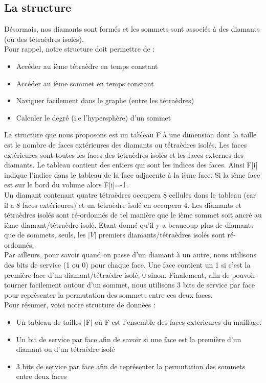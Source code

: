 \documentclass[a4paper,11pt,openany]{article}
\begin{document}
\subsection{La structure}
\noindent
Désormais, nos diamants sont formés et les sommets sont associés à des diamants (ou des tétraèdres isolés).\\
Pour rappel, notre structure doit permettre de :
\begin{itemize}
\item Accéder au ième tétraèdre en temps constant
\item Accéder au ième sommet en temps constant
\item Naviguer facilement dans le graphe (entre les tétraèdres)
\item Calculer le degré (i.e l'hypersphère) d'un sommet\\
\end{itemize}
La structure que nous proposons est un tableau F à une dimension dont la taille est le nombre de faces extérieures des diamants ou tétraèdres isolés. Les faces extérieures sont toutes les faces des tétraèdres isolés et les faces externes des diamants. Le tableau contient des entiers qui sont les indices des faces. Ainsi F[i] indique l'indice dans le tableau de la face adjacente à la ième face. Si la ième face est sur le bord du volume alors F[i]=-1.\\ 
Un diamant contenant quatre tétraèdres occupera 8 cellules dans le tableau (car il a 8 faces extérieures) et un tétraèdre isolé en occupera 4. Les diamants et tétraèdres isolés sont ré-ordonnés de tel manière que le ième sommet soit ancré au ième diamant/tétraèdre isolé. Etant donné qu'il y a beaucoup plus de diamants que de sommets, seuls, les $|V|$ premiers diamants/tétraèdres isolés sont ré-ordonnés.\\
Par ailleurs, pour savoir quand on passe d'un diamant à un autre, nous utilisons des bits de service (1 ou 0) pour chaque face. Une face contient un 1 si c'est la première face d'un diamant/tétraèdre isolé, 0 sinon. Finalement, afin de pouvoir tourner facilement autour d'un sommet, nous utilisons 3 bits de service par face pour représenter la permutation des sommets entre ces deux faces.\\
Pour résumer, voici notre structure de données :
\begin{itemize}
\item Un tableau de tailles $|$F$|$ où F est l'ensemble des faces exterieures du maillage.
\item Un bit de service par face afin de savoir si une face est la première d'un diamant ou d'un tétraèdre isolé
\item 3 bits de service par face afin de représenter la permutation des sommets entre deux faces
\end{itemize}
\end{document}

